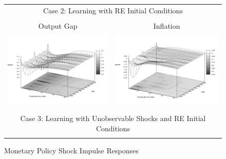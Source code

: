 \begin{figure}
\caption{Monetary Policy Shock Impulse Responses}\label{fg:irf_mp}
\vspace*{1pc}
\begin{tabular}{cc}
\multicolumn{2}{c}{Case 2: Learning with RE Initial Conditions}\\ \\
Output Gap & Inflation \\ 
\includegraphics[scale=0.25]{results_reallinit/Output_mpshock_irf3d.png} & 
\includegraphics[scale=0.25]{results_reallinit/Inflation_mpshock_irf3d.png} \\ \\ 
\multicolumn{2}{c}{Case 3: Learning with Unobservable Shocks and RE Initial Conditions}\\ \\

\end{tabular}
\end{figure}
